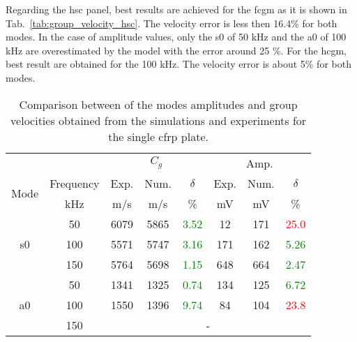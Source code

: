 Regarding the \ac{hsc} panel, best results are achieved for the \ac{fcgm} as it is shown in Tab.~\ref{tab:group_velocity_hsc}.
The velocity error is less then 16.4\% for both modes. 
In the case of amplitude values, only the \ac{s0} of 50 \unit{\kHz} and the \ac{a0} of 100 \unit{\kHz} are overestimated by the model with the error around 25 \%.
For the \ac{hcgm}, best result are obtained for the 100 \unit{\kHz}. 
The velocity error is about 5\% for both modes. 

\begin{table}[H]
	\small
	\tabcolsep=0.2cm
	\centering
	\caption{\label{tab:group_velocity_cfrp} Comparison between of the modes amplitudes and group velocities obtained from the simulations and experiments for the single \acf{cfrp} plate.}
	\begin{tabular}{cccccccc}
		\toprule
		& & \multicolumn{3}{c}{\(C_g\)} & \multicolumn{3}{c}{Amp.}\\
		\multirow{2}{*}{Mode} & Frequency & Exp. & Num. & \(\delta\)& Exp. & Num. & \(\delta\)\\
		& \unit{\kHz} & \unit[per-mode = symbol]{\m\per\s} & \unit[per-mode = symbol]{\m\per\s} & \% & \unit{\mV} & \unit{\mV} & \% \\
		\midrule
		\multirow{3}{*}{\ac{s0}} & 50 & 6079 & 5865 & \textcolor{green}{3.52}& 12 & 171 & \textcolor{red}{25.0} \\
		&100& 5571 & 5747 & \textcolor{green}{3.16} & 171 & 162 & \textcolor{green}{5.26}\\
		&150& 5764 & 5698 & \textcolor{green}{1.15} & 648 & 664 & \textcolor{green}{2.47}\\
		\midrule
		\multirow{3}{*}{\ac{a0}} &50& 1341 & 1325 & \textcolor{green}{0.74} & 134 & 125 & \textcolor{green}{6.72}\\
		&100& 1550 & 1396 & \textcolor{green}{9.74} & 84 & 104 & \textcolor{red}{23.8}\\
		&150& \multicolumn{6}{c}{-} \\
		\bottomrule
	\end{tabular}
\end{table}

